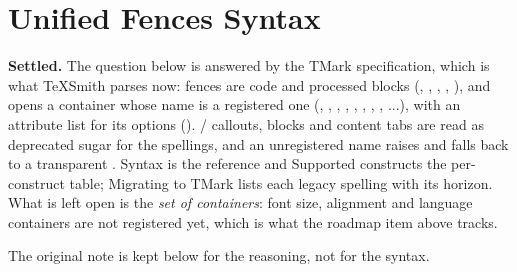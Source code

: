 \documentclass[a4paper,twoside]{article}
\begin{document}
\section{Unified Fences Syntax}
\textbf{Settled.} The question below is answered by the TMark specification, which
is what TeXSmith parses now:  fences are code and processed blocks
(, , , , ), and \tscodeinline{:::} opens a
container whose name is a registered one (, , , ,
, , , , ...), with an attribute list for its options
(). \tscodeinline{!!!} /  callouts, \tscodeinline{///}
blocks and  content tabs are read as deprecated sugar for the \tscodeinline{:::}
spellings, and an unregistered name raises  and falls back to
a transparent . Syntax is the reference and
Supported constructs the per-construct table;
Migrating to TMark lists each legacy spelling with
its horizon. What is left open is the \emph{set of containers}: font size, alignment
and language containers are not registered yet, which is what the roadmap item
above tracks.

The original note is kept below for the reasoning, not for the syntax.
\end{document}
